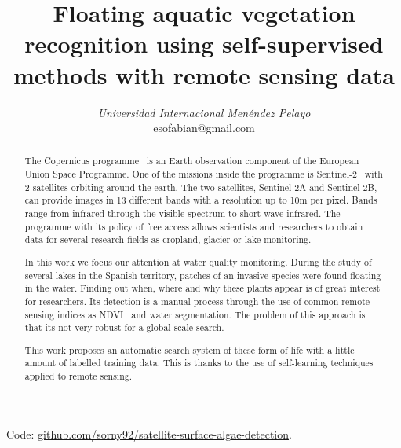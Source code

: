 \documentclass[conference]{IEEEtran}
\begin{document}
    \title{Floating aquatic vegetation recognition using self-supervised methods with remote sensing data}

    \author{
    \textit{Universidad Internacional Menéndez Pelayo}\\
    esofabian@gmail.com}

    \maketitle

    \begin{abstract}
        The Copernicus programme~\cite{whatiscopernicus} is an Earth observation component of the European Union Space
        Programme.
        One of the missions inside the programme is Sentinel-2~\cite{sentinel-2} with 2 satellites orbiting around the
        earth.
        The two satellites, Sentinel-2A and Sentinel-2B, can provide images in 13 different bands with a resolution up
        to 10m per pixel.
        Bands range from infrared through the visible spectrum to short wave infrared.
        The programme with its policy of free access allows scientists and researchers to obtain data for several
        research fields as cropland, glacier or lake monitoring.

        In this work we focus our attention at water quality monitoring.
        During the study of several lakes in the Spanish territory, patches of an invasive species were found floating in the water.
        Finding out when, where and why these plants appear is of great interest for researchers.
        Its detection is a manual process through the use of common remote-sensing indices as NDVI~\cite{NDVIsource}
        and water segmentation.
        The problem of this approach is that its not very robust for a global scale search.

        This work proposes an automatic search system of these form of life with a little amount of labelled training data.
        This is thanks to the use of self-learning techniques applied to remote sensing.
    \end{abstract}
    \newline
    Code: \href{https://github.com/sorny92/satellite-surface-algae-detection}{github.com/sorny92/satellite-surface-algae-detection}.
    \newline
\end{document}
